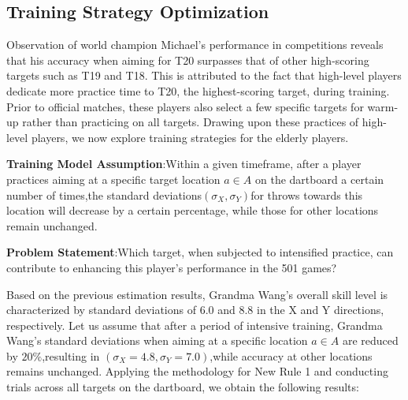\documentclass[cjjs]{ipart}
\theoremstyle{plain}
\begin{document}
\subsection{Training Strategy Optimization}
Observation of world champion Michael's performance in competitions reveals that his accuracy when aiming for T20 surpasses that of other high-scoring targets such as T19 and T18. This is attributed to the fact that high-level players dedicate more practice time to T20, the highest-scoring target, during training. Prior to official matches, these players also select a few specific targets for warm-up rather than practicing on all targets. Drawing upon these practices of high-level players, we now explore training strategies for the elderly players.

\textbf{Training Model Assumption}:Within a given timeframe, after a player practices aiming at a specific target location $a\in A$ on the dartboard a certain number of times,the standard deviations$(\sigma_X, \sigma_Y)$for throws towards this location will decrease by a certain percentage, while those for other locations remain unchanged.\skip 

\textbf{Problem Statement}:Which target, when subjected to intensified practice, can contribute to enhancing this player's performance in the 501 games?

Based on the previous estimation results, Grandma Wang's overall skill level is characterized by standard deviations of 6.0 and 8.8 in the X and Y directions, respectively. Let us assume that after a period of intensive training, Grandma Wang's standard deviations when aiming at a specific location $a \in A$ are reduced by $20\%$,resulting in $(\sigma_X = 4.8, \sigma_Y = 7.0)$,while accuracy at other locations remains unchanged. Applying the methodology for New Rule 1 and conducting trials across all targets on the dartboard, we obtain the following results:
\end{document}
